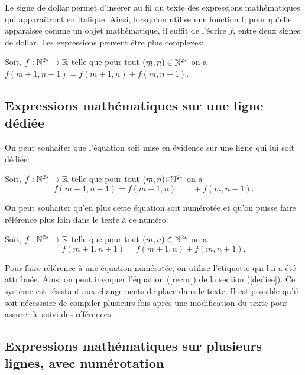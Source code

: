 \documentclass[10pt]{article}
\begin{document}
Le signe de dollar permet d'insérer au fil du texte des expressions
mathématiques qui apparaîtront en italique. Ainsi, lorsqu'on utilise une
fonction f, pour qu'elle apparaisse comme un objet mathématique, il
suffit de l'écrire \(f\), entre deux signes de dollar. Les expressions
peuvent être plus complexes:

Soit, \(f: \Bbb{N}^{2*} \rightarrow \Bbb{R}\) telle que pour tout
\((m,n) \in \Bbb{N}^{2*}\) on a \(f(m+1,n+1) = f(m+1,n) + f(m,n+1)\).

\hypertarget{expressions-mathematiques-sur-une-ligne-dediee}{%
\subsection{\texorpdfstring{Expressions mathématiques sur une ligne
dédiée
\label{dediee}}{Expressions mathématiques sur une ligne dédiée }}\label{expressions-mathematiques-sur-une-ligne-dediee}}

On peut souhaiter que l'équation soit mise en évidence sur une ligne qui
lui soit dédiée:

Soit, \(f: \Bbb{N}^{2*} \rightarrow \Bbb{R}\) telle que pour tout
\((m, n) {\in} \Bbb{N}^{2*}\) on a \begin{equation*}
f(m+1,n+1) = f(m+1,n) \qquad+ f(m,n+1).
\end{equation*}

On peut souhaiter qu'en plus cette équation soit numérotée et qu'on
puisse faire référence plus loin dans le texte à ce numéro:

Soit, \(f:\Bbb{N}^{2*} \rightarrow \Bbb{R}\) telle que pour tout
\((m,n) \in \Bbb{N}^{2*}\) on a \begin{equation}
f(m+1,n+1) = f(m+1,n) + f(m,n+1). \label{recur}
\end{equation}

Pour faire référence à une équation numérotée, on utilise l'étiquette
qui lui a été attribuée. Ainsi on peut invoquer l'équation (\ref{recur})
de la section (\ref{dediee}). Ce système est résistant aux changements
de place dans le texte. Il est possible qu'il soit nécessaire de
compiler plusieurs fois après une modification du texte pour assurer le
suivi des références.

\hypertarget{expressions-mathematiques-sur-plusieurs-lignes-avec-numerotation}{%
\subsection{\texorpdfstring{Expressions mathématiques sur plusieurs
lignes, avec numérotation
\label{numero}}{Expressions mathématiques sur plusieurs lignes, avec numérotation }}\label{expressions-mathematiques-sur-plusieurs-lignes-avec-numerotation}}
\end{document}
